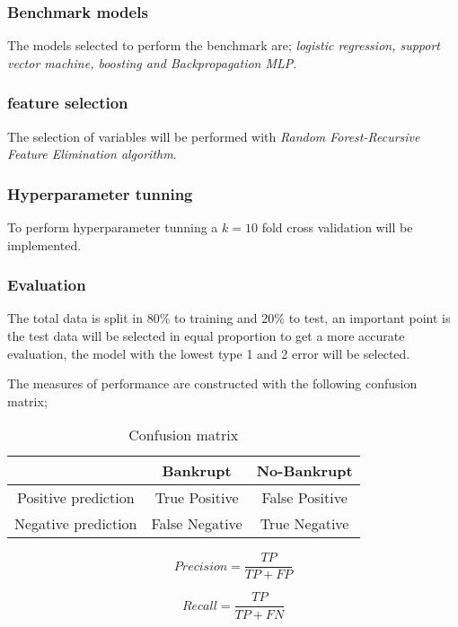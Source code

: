 \documentclass[journal]{IEEEtai}
\begin{document}
\subsubsection{Benchmark models}
The models selected to perform the benchmark are; \textit{logistic regression, support vector machine, boosting and Backpropagation MLP}.


\subsubsection{feature selection}
The selection of variables will be performed with \textit{ Random Forest-Recursive Feature Elimination algorithm}.



\subsubsection{Hyperparameter tunning}
To perform hyperparameter tunning a $k=10$ fold cross validation will be implemented.


\subsubsection{Evaluation}
The total data is split in 80\% to training and 20\% to test, an important point is the test data will be selected in equal proportion to get a more accurate evaluation, the model with the lowest type 1 and 2 error will be selected.

The measures of performance are constructed with the following confusion matrix; 
\begin{table}[h]
\centering
\begin{tabular}{ccc}
	\hline
 & Bankrupt & No-Bankrupt \\ \hline
Positive prediction & True Positive & False Positive \\
Negative prediction & False Negative & True Negative \\ \hline
\end{tabular}
\caption{Confusion matrix}
\label{confusemat}
\end{table}

\begin{equation}
Precision = \frac{TP}{TP + FP}
\end{equation}


\begin{equation}
Recall = \frac{TP}{TP+ FN}
\end{equation}
\end{document}
